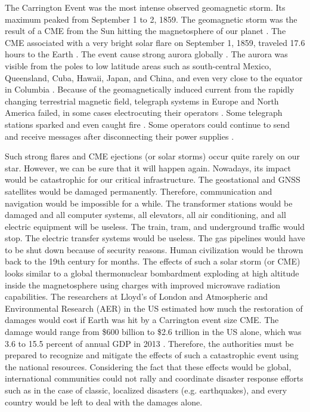 \documentclass[sn-aps]{sn-jnl}%
\begin{document}
The Carrington Event was the most intense observed geomagnetic storm. Its maximum peaked from September 1 to 2, 1859. The geomagnetic storm was the result of a CME from the Sun hitting the magnetosphere of our planet \cite{tsurutani03:_septem}. The CME associated with a very bright solar flare on September 1, 1859, traveled 17.6 hours to the Earth \cite{odenwald08:_bracin}.  The event cause strong aurora globally \cite{kimball60:_study_auror}. The aurora was visible from the poles to low latitude areas such as south-central Mexico, Queensland, Cuba, Hawaii, Japan, and China, and even very close to the equator in Columbia \cite{hayakawa18:_low_auror_extrem_space_weath_event,gonzalez-esparza18:_obser_low_latit_red_auror,green06:_durat,hayakawa16:_east_asian_carrin,moreno16:_colom}. Because of the geomagnetically induced current from the rapidly changing terrestrial magnetic field, telegraph systems in Europe and North America failed, in some cases electrocuting their operators \cite{societal08:_sever_space_weath_event}. Some telegraph stations sparked and even caught fire \cite{odenwald02:_cycle}. Some operators could continue to send and receive messages after disconnecting their power supplies \cite{carlowicz02:_storm_sun}.

Such strong flares and CME ejections (or solar storms) occur quite rarely on our star. However, we can be sure that it will happen again. Nowadays, its impact would be catastrophic for our critical infrastructure. The geostational and GNSS satellites would be damaged permanently. Therefore, communication and navigation would be impossible for a while. The transformer stations would be damaged and all computer systems, all elevators, all air conditioning, and all electric equipment will be useless. The train, tram, and underground traffic would stop. The electric transfer systems would be useless. The gas pipelines would have to be shut down because of security reasons. Human civilization would be thrown back to the 19th century for months. The effects of such a solar storm (or CME) looks similar to a global thermonuclear bombardment exploding at high altitude inside the magnetosphere using charges with improved microwave radiation capabilities. The researchers at Lloyd's of London and Atmospheric and Environmental Research (AER) in the US estimated how much the restoration of damages would cost if Earth was hit by a Carrington event size CME. The damage would range from \$600 billion to \$2.6 trillion in the US alone, which was 3.6 to 15.5 percent of annual GDP in 2013 \cite{london13:_solar_storm_risk_north_americ_elect_grid}. Therefore, the authorities must be prepared to recognize and mitigate the effects of such a catastrophic event using the national resources. Considering the fact that these effects would be global, international communities could not rally and coordinate disaster response efforts such as in the case of classic, localized disasters (e.g. earthquakes), and every country would be left to deal with the damages alone.
\end{document}
